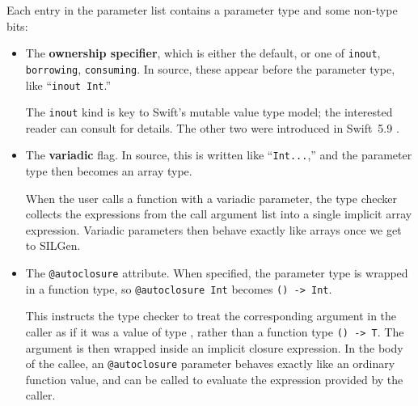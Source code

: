 \documentclass[../generics]{subfiles}
\begin{document}
Each entry in the parameter list contains a parameter type and some non-type bits:
\begin{itemize}
\item The \textbf{ownership specifier}, which is either the default, or one of \texttt{inout}, \texttt{borrowing}, \texttt{consuming}. In source, these appear before the parameter type, like ``\texttt{inout Int}.''

The \texttt{inout} kind is key to Swift's mutable value type model; the interested reader can consult \cite{valuesemantics} for details. The other two were introduced in Swift~5.9 \cite{se0377}.

\item The \textbf{variadic} flag. In source, this is written like ``\texttt{Int...},'' and the parameter type then becomes an array type.

When the user calls a function with a variadic parameter, the type checker collects the expressions from the call argument list into a single implicit array expression. Variadic parameters then behave exactly like arrays once we get to SILGen.

\item The \texttt{@autoclosure} attribute. When specified, the parameter type is wrapped in a function type, so \texttt{@autoclosure Int} becomes \texttt{() -> Int}.

This instructs the type checker to treat the corresponding argument in the caller as if it was a value of type \tT, rather than a function type \verb|() -> T|. The argument is then wrapped inside an implicit closure expression. In the body of the callee, an \texttt{@autoclosure} parameter behaves exactly like an ordinary function value, and can be called to evaluate the expression provided by the caller.
\end{itemize}
\end{document}
